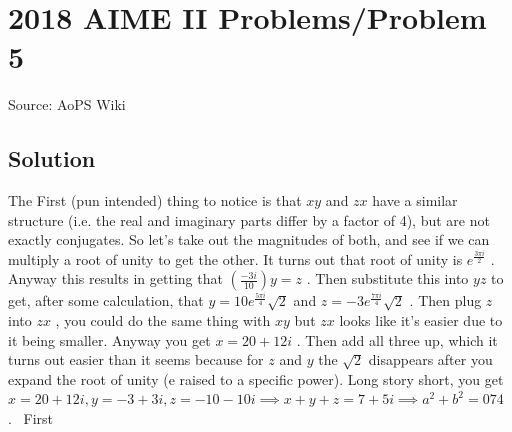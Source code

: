 \documentclass[12pt]{article}
\begin{document}
\section*{{2018 AIME II Problems/Problem 5}}
Source: AoPS Wiki

\subsection*{Solution}
The First (pun intended) thing to notice is that $xy$ and $zx$ have a similar structure (i.e. the real and imaginary parts differ by a factor of 4), but are not exactly conjugates. So let's take out the magnitudes of both, and see if we can multiply a root of unity to get the other. It turns out that root of unity is $e^{\frac{3\pi i}{2}}$ . Anyway this results in getting that $\left(\frac{-3i}{10}\right)y=z$ . Then substitute this into $yz$ to get, after some calculation, that $y=10e^{\frac{5\pi i}{4}}\sqrt{2}$ and $z=-3e^{\frac{7\pi i}{4}}\sqrt{2}$ . Then plug $z$ into $zx$ , you could do the same thing with $xy$ but $zx$ looks like it's easier due to it being smaller. Anyway you get $x=20+12i$ . Then add all three up, which it turns out easier than it seems because for $z$ and $y$ the $\sqrt{2}$ disappears after you expand the root of unity (e raised to a specific power). Long story short, you get $x=20+12i, y=-3+3i, z=-10-10i \implies x+y+z=7+5i \implies a^2+b^2=\boxed{074}$ . ~First
\end{document}
